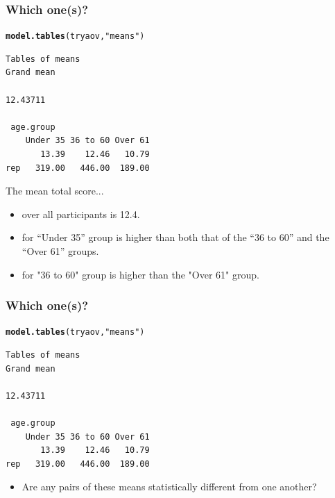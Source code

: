 \documentclass{beamer}\usepackage[]{graphicx}\usepackage[]{color}
\makeatletter
\newcommand{\hlstr}[1]{\textcolor[rgb]{0.192,0.494,0.8}{#1}}%
\newcommand{\hlstd}[1]{\textcolor[rgb]{0.345,0.345,0.345}{#1}}%
\newcommand{\hlkwd}[1]{\textcolor[rgb]{0.737,0.353,0.396}{\textbf{#1}}}%
\newenvironment{kframe}{%
 \def\at@end@of@kframe{}%
 \ifinner\ifhmode%
  \def\at@end@of@kframe{\end{minipage}}%
  \begin{minipage}{\columnwidth}%
 \fi\fi%
 \def\FrameCommand##1{\hskip\@totalleftmargin \hskip-\fboxsep
 \colorbox{shadecolor}{##1}\hskip-\fboxsep
     \hskip-\linewidth \hskip-\@totalleftmargin \hskip\columnwidth}%
 \MakeFramed {\advance\hsize-\width
   \@totalleftmargin\z@ \linewidth\hsize
   \@setminipage}}%
 {\par\unskip\endMakeFramed%
 \at@end@of@kframe}
\newenvironment{knitrout}{}{} %
\makeatother
\begin{document}
\begin{frame}[fragile]
\frametitle{Which one(s)?}
\begin{knitrout}\small
{}\color{fgcolor}\begin{kframe}
\begin{alltt}
\hlkwd{model.tables}\hlstd{(tryaov,} \hlstr{"means"}\hlstd{)}
\end{alltt}
\begin{verbatim}
Tables of means
Grand mean
         
12.43711 

 age.group 
    Under 35 36 to 60 Over 61
       13.39    12.46   10.79
rep   319.00   446.00  189.00
\end{verbatim}
\end{kframe}
\end{knitrout}

The mean total score...
\begin{itemize}
\item over all participants is 12.4.
\item for ``Under 35'' group is higher than both that of the ``36 to 60'' and the ``Over 61'' groups.
\item for "36 to 60" group is higher than the "Over 61" group.
\end{itemize}
\end{frame}

\begin{frame}[fragile]
\frametitle{Which one(s)?}
\begin{knitrout}
\color{fgcolor}\begin{kframe}
\begin{alltt}
\hlkwd{model.tables}\hlstd{(tryaov,} \hlstr{"means"}\hlstd{)}
\end{alltt}
\begin{verbatim}
Tables of means
Grand mean
         
12.43711 

 age.group 
    Under 35 36 to 60 Over 61
       13.39    12.46   10.79
rep   319.00   446.00  189.00
\end{verbatim}
\end{kframe}
\end{knitrout}

\begin{itemize}
\item Are any pairs of these means statistically different from one another?
\end{itemize}
\end{frame}
\end{document}
